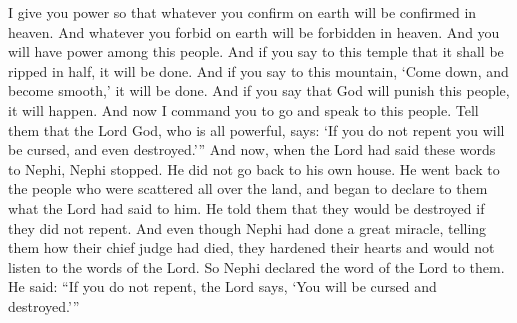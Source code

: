 I give you power so that whatever you confirm on earth will be confirmed in heaven. And whatever you forbid on earth will be forbidden in heaven. And you will have power among this people.
\bverse \iffalse And thus, if ye shall say unto this temple it shall be rent in twain, it shall be done. \fi
And if you say to this temple that it shall be ripped in half, it will be done.
\bverse \iffalse And if ye shall say unto this mountain, Be thou cast down and become smooth, it shall be done. \fi
And if you say to this mountain, \lq Come down, and become smooth,\rq{}  it will be done.
\bverse \iffalse And behold, if ye shall say that God shall smite this people, it shall come to pass. \fi
And if you say that God will punish this people, it will happen.
\bverse \iffalse And now behold, I command you, that ye shall go and declare unto this people, that thus saith the Lord God, who is the Almighty: Except ye repent ye shall be smitten, even unto destruction. \fi
And now I command you to go and speak to this people. Tell them that the Lord God, who is all powerful, says: \lq If you do not repent you will be cursed, and even destroyed.\rq ''
\bverse \iffalse And behold, now it came to pass that when the Lord had spoken these words unto Nephi, he did stop and did not go unto his own house, but did return unto the multitudes who were scattered about upon the face of the land, and began to declare unto them the word of the Lord which had been spoken unto him, concerning their destruction if they did not repent. \fi
And now, when the Lord had said these words to Nephi, Nephi stopped. He did not go back to his own house. He went back to the people who were scattered all over the land, and began to declare to them what the Lord had said to him. He told them that they would be destroyed if they did not repent.
\bverse \iffalse Now behold, notwithstanding that great miracle which Nephi had done in telling them concerning the death of the chief judge, they did harden their hearts and did not hearken unto the words of the Lord. \fi
And even though Nephi had done a great miracle, telling them how their chief judge had died, they hardened their hearts and would not listen to the words of the Lord.
\bverse \iffalse Therefore Nephi did declare unto them the word of the Lord, saying: Except ye repent, thus saith the Lord, ye shall be smitten even unto destruction. \fi
So Nephi declared the word of the Lord to them. He said: ``If you do not repent, the Lord says, \lq You will be cursed and destroyed.\rq ''
